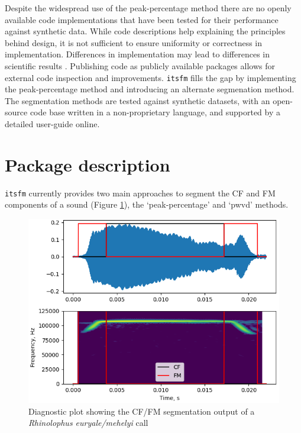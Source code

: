 \documentclass[
]{book}
\begin{document}
Despite the widespread use of the peak-percentage method there are no openly available code implementations that have been tested for their performance against synthetic data. While code descriptions help explaining the principles behind design, it is not sufficient to ensure uniformity or correctness in implementation. Differences in implementation may lead to differences in scientific results \citep{bakervincent2019, mcfee2018open}. Publishing code as publicly available packages allows for external code inspection and improvements. \texttt{itsfm} fills the gap by implementing the peak-percentage method and introducing an alternate segmenation method. The segmentation methods are tested against synthetic datasets, with an open-source code base written in a non-proprietary language, and supported by a detailed user-guide online.

\hypertarget{package-description}{%
\section{Package description}\label{package-description}}

\texttt{itsfm} currently provides two main approaches to segment the CF and FM components of a sound (Figure \ref{fig:cffmseg}), the `peak-percentage' and `pwvd' methods.

\begin{figure}
\includegraphics[width=1\linewidth]{original_papers/itsfm-paper/figures/pwvd_cffm_segmentation} \caption{Diagnostic plot showing the CF/FM segmentation output of a \textit{Rhinolophus euryale/mehelyi} call}\label{fig:cffmseg}
\end{figure}
\end{document}
